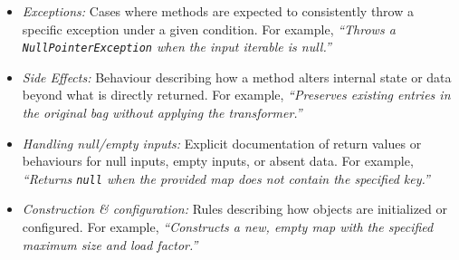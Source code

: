 \begin{itemize}
    \item \textit{Exceptions:} Cases where methods are expected to consistently throw a specific exception under a given condition.
    For example, \textit{``Throws a \texttt{NullPointerException} when the input iterable is null.''}%
    \item \textit{Side Effects:} Behaviour describing how a method alters internal state or data beyond what is directly returned. 
    For example, \textit{``Preserves existing entries in the original bag without applying the transformer.''}%
    \item \textit{Handling null/empty inputs:} Explicit documentation of return values or behaviours for null inputs, empty inputs, or absent data.
    For example, \textit{``Returns \texttt{null} when the provided map does not contain the specified key.''}%
    \item \textit{Construction \& configuration:} Rules describing how objects are initialized or configured. %
    For example, \textit{``Constructs a new, empty map with the specified maximum size and load factor.''} %

\end{itemize}
